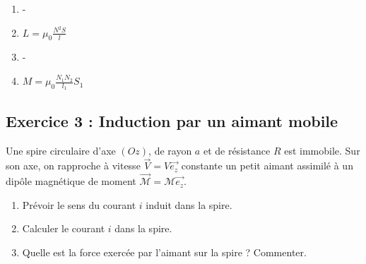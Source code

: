 \begin{enumerate}
	\item -
	\item $L = \mu_0 \frac{N^2 S}{l}$
	\item -
	\item $M = \mu_0 \frac{N_1 N_2}{l_1}S_1$
\end{enumerate}

\subsection{Exercice 3 : Induction par un aimant mobile}

Une spire circulaire d'axe $(Oz)$, de rayon $a$ et de résistance $R$ est immobile. Sur son axe, on rapproche à vitesse $\vec{V} = V \vec{e_z}$ constante un petit aimant assimilé à un dipôle magnétique de moment $\vec{\mathcal{M}} = \mathcal{M}\vec{e_z}$.

\begin{enumerate}
	\item Prévoir le sens du courant $i$ induit dans la spire.
	\item Calculer le courant $i$ dans la spire.
	\item Quelle est la force exercée par l'aimant sur la spire ? Commenter.
\end{enumerate}